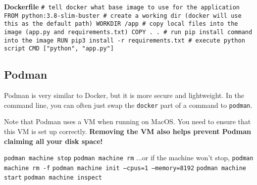 \textbf{Dockerfile}\newline
\texttt{\# tell docker what base image to use for the application\newline
FROM python:3.8-slim-buster\newline
\newline
\# create a working dir (docker will use this as the default path)\newline
WORKDIR /app\newline
\newline
\# copy local files into the image (app.py and requirements.txt)\newline
COPY . .\newline
\newline
\# run pip install command into the image\newline
RUN pip3 install -r requirements.txt\newline
\newline
\# execute python script\newline
CMD ["python", "app.py"]}\newline



\subsection{Podman}

Podman is very similar to Docker, but it is more secure and lightweight.
In the command line, you can often just swap the \texttt{docker} part of a command to \texttt{podman}.

Note that Podman uses a VM when running on MacOS. You need to ensure that this VM is set up correctly.
\textbf{Removing the VM also helps prevent Podman claiming all your disk space!}

\texttt{podman machine stop}\newline
\texttt{podman machine rm} \enspace ...or if the machine won't stop,\; \texttt{podman machine rm -f}\newline
\texttt{podman machine init --cpus=1 --memory=8192}\newline
\texttt{podman machine start}\newline
\texttt{podman machine inspect}

